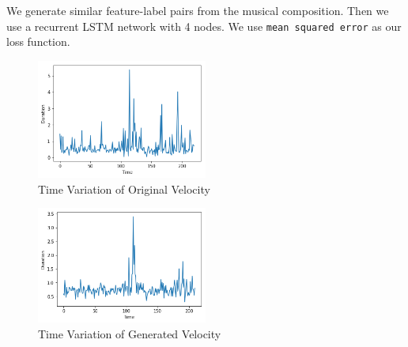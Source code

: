 \documentclass[conference]{IEEEtran}
\begin{document}
We generate similar feature-label pairs from the musical composition. Then we use a recurrent LSTM network with 4 nodes. We use \texttt{mean squared error} as our loss function.
\begin{figure}[h]
\includegraphics[width=0.5\textwidth]{IEEEtran/rest_o.png}
\caption{Time Variation of Original Velocity}
\label{fig:figure5}
\end{figure}

\begin{figure}[h]
\includegraphics[width=0.5\textwidth]{IEEEtran/rest_g.png}
\caption{Time Variation of Generated Velocity}
\label{fig:figure6}
\end{figure}
%
%
\end{document}
